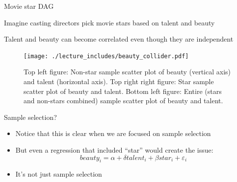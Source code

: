 \documentclass{beamer}
\begin{document}
\begin{frame}{Movie star DAG}

Imagine casting directors pick movie stars based on talent and beauty

  \begin{center}
  \end{center}

Talent and beauty can become correlated even though they are independent


\end{frame}

\begin{frame}[shrink=20,plain]

  \begin{figure}
    \texttt{[image: ./lecture\_includes/beauty\_collider.pdf]}
    \caption{Top left figure: Non-star sample scatter plot of beauty (vertical axis) and talent (horizontal axis). Top right right figure: Star sample scatter plot of beauty and talent.  Bottom left figure: Entire (stars and non-stars combined) sample scatter plot of beauty and talent.}
  \end{figure}
\end{frame}

\begin{frame}{Sample selection?}

\begin{itemize}
\item Notice that this is clear when we are focused on sample selection
\item But even a regression that included ``star'' would create the issue:$$beauty_i = \alpha + \delta talent_i + \beta star_i + \varepsilon_i$$
\item It's not just sample selection 
\end{itemize}

\end{frame}
\end{document}
